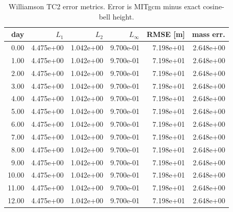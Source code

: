 \begin{table}[htbp]
\centering
{}
\begin{tabular}{rrrrrr}
\toprule
\rowcolor{gray!25}
day & $L_1$ & $L_2$ & $L_\infty$ & RMSE [m] & mass err. \\ 
\midrule
0.00 & 4.475e+00 & 1.042e+00 & 9.700e-01 & 7.198e+01 & 2.648e+00 \\ 
1.00 & 4.475e+00 & 1.042e+00 & 9.700e-01 & 7.198e+01 & 2.648e+00 \\ 
2.00 & 4.475e+00 & 1.042e+00 & 9.700e-01 & 7.198e+01 & 2.648e+00 \\ 
3.00 & 4.475e+00 & 1.042e+00 & 9.700e-01 & 7.198e+01 & 2.648e+00 \\ 
4.00 & 4.475e+00 & 1.042e+00 & 9.700e-01 & 7.198e+01 & 2.648e+00 \\ 
5.00 & 4.475e+00 & 1.042e+00 & 9.700e-01 & 7.198e+01 & 2.648e+00 \\ 
6.00 & 4.475e+00 & 1.042e+00 & 9.700e-01 & 7.198e+01 & 2.648e+00 \\ 
7.00 & 4.475e+00 & 1.042e+00 & 9.700e-01 & 7.198e+01 & 2.648e+00 \\ 
8.00 & 4.475e+00 & 1.042e+00 & 9.700e-01 & 7.198e+01 & 2.648e+00 \\ 
9.00 & 4.475e+00 & 1.042e+00 & 9.700e-01 & 7.198e+01 & 2.648e+00 \\ 
10.00 & 4.475e+00 & 1.042e+00 & 9.700e-01 & 7.198e+01 & 2.648e+00 \\ 
11.00 & 4.475e+00 & 1.042e+00 & 9.700e-01 & 7.198e+01 & 2.648e+00 \\ 
12.00 & 4.475e+00 & 1.042e+00 & 9.700e-01 & 7.198e+01 & 2.648e+00 \\ 
\bottomrule
\end{tabular}
\caption{Williamson TC2 error metrics. Error is MITgcm minus exact cosine-bell height.}
\end{table}
